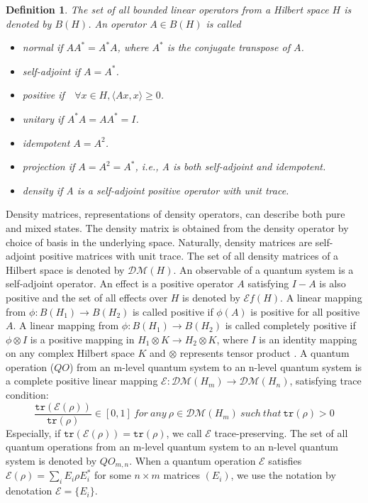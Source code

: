 \documentclass[a4paper, 11pt]{article}
\newtheorem{definition}{Definition}
\begin{document}
\begin{definition}
The set of all bounded linear operators from a Hilbert space $H$ is denoted by $B(H)$.  An operator $A\in B(H)$ is called 
\begin{itemize}
\item[(a)] normal if $AA^*=A^*A$, where $A^*$ is the conjugate transpose of $A$.
\item[(b)] self-adjoint if $A=A^*$.
\item[(c)] positive if\ \ $\forall x\in H,\langle Ax,x\rangle\ge 0$.
\item[(d)] unitary if $A^*A=AA^*=I$.
\item[(e)] idempotent $A=A^2$.
\item[(f)] projection if $A=A^2=A^*$, i.e., A is both self-adjoint and idempotent. 
\item[(g)] density if A is a self-adjoint positive operator with unit trace. 
\end{itemize}
\end{definition}

Density matrices, representations of density operators, can describe both pure and mixed states. The density matrix is obtained from the density operator by choice of basis in the underlying space. Naturally, density matrices are self-adjoint positive matrices with unit trace. The set of all density matrices of a Hilbert space is denoted by $\mathcal{DM}(H)$.  An observable of a quantum system is a self-adjoint operator. An effect is a positive operator $A$ satisfying $I-A$ is also positive and the set of all effects over $H$ is denoted by $\mathcal{E}f(H)$. A linear mapping from $\phi:B(H_1)\rightarrow B(H_2)$ is called positive if $\phi(A)$ is positive for all positive $A$. A linear mapping from $\phi:B(H_1)\rightarrow B(H_2)$ is called completely positive if $\phi\otimes I$ is a positive mapping in $H_1\otimes K\rightarrow H_2\otimes K$, where $I$ is an identity mapping on any complex Hilbert space $K$ and $\otimes$ represents tensor product \cite{NM08}. A quantum operation ($QO$) from an m-level quantum system to an n-level quantum system is a complete positive linear mapping $\mathcal{E}:\mathcal{DM}(H_m)\rightarrow \mathcal{DM}(H_n)$, satisfying trace condition:
$$
\frac{\texttt{tr}(\mathcal{E}(\rho))}{\texttt{tr}(\rho)}\in [0,1]\  for\ any\ \rho\in \mathcal{DM}(H_m)\ such \ that\ \texttt{tr}(\rho)>0
$$ 
Especially, if $\texttt{tr}(\mathcal{E}(\rho))=\texttt{tr}(\rho)$, we call $\mathcal{E}$ trace-preserving. The set of all quantum operations from an m-level quantum system to an n-level quantum system is denoted by $QO_{m,n}$. When a quantum operation $\mathcal{E}$ satisfies $\mathcal{E}(\rho)=\sum_i E_i\rho E_i^*$ for some $n\times m$ matrices $(E_i)$, we use the notation by denotation $\mathcal{E}=\{E_i\}$.
\end{document}
